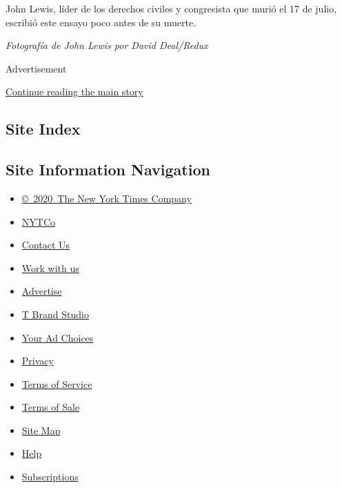 John Lewis, líder de los derechos civiles y congresista que murió el 17
de julio, escribió este ensayo poco antes de su muerte.

\emph{Fotografía de John Lewis por David Deal/Redux}

Advertisement

\protect\hyperlink{after-bottom}{Continue reading the main story}

\hypertarget{site-index}{%
\subsection{Site Index}\label{site-index}}

\hypertarget{site-information-navigation}{%
\subsection{Site Information
Navigation}\label{site-information-navigation}}

\begin{itemize}
\tightlist
\item
  \href{https://help.nytimes.com/hc/en-us/articles/115014792127-Copyright-notice}{©~2020~The
  New York Times Company}
\end{itemize}

\begin{itemize}
\tightlist
\item
  \href{https://www.nytco.com/}{NYTCo}
\item
  \href{https://help.nytimes.com/hc/en-us/articles/115015385887-Contact-Us}{Contact
  Us}
\item
  \href{https://www.nytco.com/careers/}{Work with us}
\item
  \href{https://nytmediakit.com/}{Advertise}
\item
  \href{http://www.tbrandstudio.com/}{T Brand Studio}
\item
  \href{https://www.nytimes.com/privacy/cookie-policy\#how-do-i-manage-trackers}{Your
  Ad Choices}
\item
  \href{https://www.nytimes.com/privacy}{Privacy}
\item
  \href{https://help.nytimes.com/hc/en-us/articles/115014893428-Terms-of-service}{Terms
  of Service}
\item
  \href{https://help.nytimes.com/hc/en-us/articles/115014893968-Terms-of-sale}{Terms
  of Sale}
\item
  \href{https://spiderbites.nytimes.com}{Site Map}
\item
  \href{https://help.nytimes.com/hc/en-us}{Help}
\item
  \href{https://www.nytimes.com/subscription?campaignId=37WXW}{Subscriptions}
\end{itemize}

